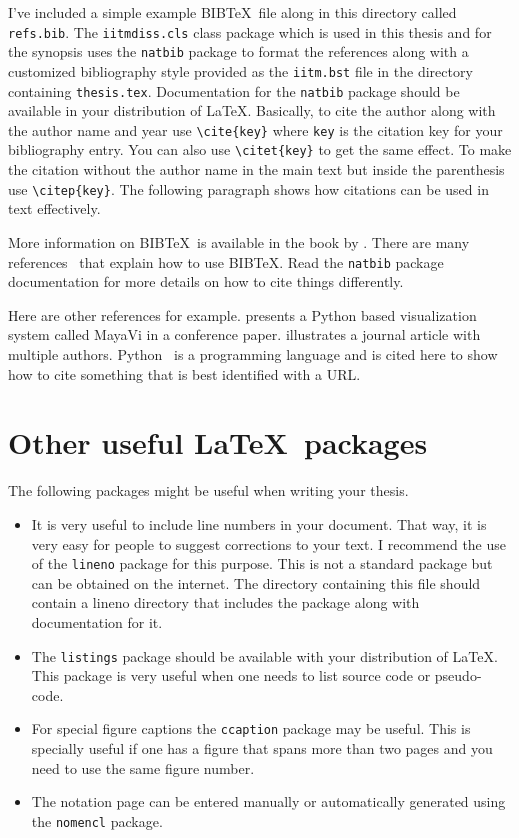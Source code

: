 \documentclass[MTech]{iitmdiss}
\begin{document}
I've included a simple example BIB\TeX\ file along in this directory
called \verb+refs.bib+.  The \verb+iitmdiss.cls+ class package which
is used in this thesis and for the synopsis uses the \verb+natbib+
package to format the references along with a customized bibliography
style provided as the \verb+iitm.bst+ file in the directory containing
\verb+thesis.tex+.  Documentation for the \verb+natbib+ package should
be available in your distribution of \LaTeX.  Basically, to cite the
author along with the author name and year use \verb+\cite{key}+ where
\verb+key+ is the citation key for your bibliography entry.  You can
also use \verb+\citet{key}+ to get the same effect.  To make the
citation without the author name in the main text but inside the
parenthesis use \verb+\citep{key}+.  The following paragraph shows how
citations can be used in text effectively.

More information on BIB\TeX\ is available in the book by
\cite{lamport:86}.  There are many
references~\citep{lamport:86,prabhu:xx} that explain how to use
BIB\TeX.  Read the \verb+natbib+ package documentation for more
details on how to cite things differently.

Here are other references for example.  \citet{viz:mayavi} presents a
Python based visualization system called MayaVi in a conference paper.
\citet{pan:pr:flat-fst} illustrates a journal article with multiple
authors.  Python~\citep{py:python} is a programming language and is
cited here to show how to cite something that is best identified with
a URL.

\section{Other useful \LaTeX\ packages}

The following packages might be useful when writing your thesis.

\begin{itemize}  
\item It is very useful to include line numbers in your document.
  That way, it is very easy for people to suggest corrections to your
  text.  I recommend the use of the \texttt{lineno} package for this
  purpose.  This is not a standard package but can be obtained on the
  internet.  The directory containing this file should contain a
  lineno directory that includes the package along with documentation
  for it.

\item The \texttt{listings} package should be available with your
  distribution of \LaTeX.  This package is very useful when one needs
  to list source code or pseudo-code.

\item For special figure captions the \texttt{ccaption} package may be
  useful.  This is specially useful if one has a figure that spans
  more than two pages and you need to use the same figure number.

\item The notation page can be entered manually or automatically
  generated using the \texttt{nomencl} package.

\end{itemize}
\end{document}
